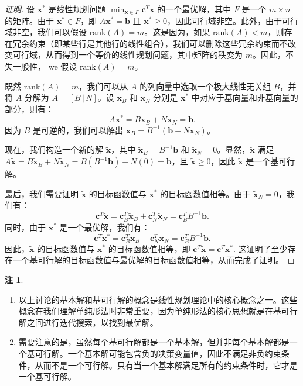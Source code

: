 \documentclass[12pt]{article}
\theoremstyle{plain}
\theoremstyle{definition}
\newtheorem{rmk}{注}[subsection]
\newenvironment{prf}[1][证明]{\begin{proof}[#1]}{\end{proof}}
\newcommand{\rank}{\mathrm{rank}}
\begin{document}
\begin{prf}
    设 $\bm{x}^*$ 是线性规划问题 $\displaystyle \min_{\bm{x} \in F} \bm{c}^T \bm{x}$ 的一个最优解，其中 $F$ 是一个 $m \times n$ 的矩阵。由于 $\bm{x}^* \in F$，即 $A\bm{x}^* = \bm{b}$ 且 $\bm{x}^* \geq 0$，因此可行域非空。此外，由于可行域非空，我们可以假设 $\rank(A) = m$。这是因为，如果 $\rank(A) < m$，则存在冗余约束（即某些行是其他行的线性组合），我们可以删除这些冗余约束而不改变可行域，从而得到一个等价的线性规划问题，其中矩阵的秩变为 $m$。因此，不失一般性， we 假设 $\rank(A) = m$。

    既然 $\rank(A) = m$，我们可以从 $A$ 的列向量中选取一个极大线性无关组 $B$，并将 $A$ 分解为 $A = [B \,|\, N]$。设 $\bm{x}_B$ 和 $\bm{x}_N$ 分别是 $\bm{x}^*$ 中对应于基向量和非基向量的部分，则有：
    \[
    A\bm{x}^* = B\bm{x}_B + N\bm{x}_N = \bm{b}.
    \]
    因为 $B$ 是可逆的，我们可以解出 $\bm{x}_B = B^{-1}(\bm{b} - N\bm{x}_N)$。

    现在，我们构造一个新的解 $\tilde{\bm{x}}$，其中 $\tilde{\bm{x}}_B = B^{-1}\bm{b}$ 和 $\tilde{\bm{x}}_N = 0$。显然，$\tilde{\bm{x}}$ 满足 $A\tilde{\bm{x}} = B\tilde{\bm{x}}_B + N\tilde{\bm{x}}_N = B(B^{-1}\bm{b}) + N(0) = \bm{b}$，且 $\tilde{\bm{x}} \geq 0$，因此 $\tilde{\bm{x}}$ 是一个基可行解。

    最后，我们需要证明 $\tilde{\bm{x}}$ 的目标函数值与 $\bm{x}^*$ 的目标函数值相等。由于 $\tilde{\bm{x}}_N = 0$，我们有：
    \[
    \bm{c}^T \tilde{\bm{x}} = \bm{c}_B^T \tilde{\bm{x}}_B + \bm{c}_N^T \tilde{\bm{x}}_N = \bm{c}_B^T B^{-1}\bm{b}.
    \]
    同时，由于 $\bm{x}^*$ 是一个最优解，我们有：
    \[
    \bm{c}^T \bm{x}^* = \bm{c}_B^T \bm{x}_B + \bm{c}_N^T \bm{x}_N = \bm{c}_B^T B^{-1}\bm{b}.
    \]
    因此，$\tilde{\bm{x}}$ 的目标函数值与 $\bm{x}^*$ 的目标函数值相等，即 $\bm{c}^T \tilde{\bm{x}} = \bm{c}^T \bm{x}^*$. 这证明了至少存在一个基可行解的目标函数值与最优解的目标函数值相等，从而完成了证明。
\end{prf}
\begin{rmk}
    \begin{enumerate}
        \item 以上讨论的基本解和基可行解的概念是线性规划理论中的核心概念之一。这些概念在我们理解单纯形法时非常重要，因为单纯形法的核心思想就是在基可行解之间进行迭代搜索，以找到最优解。
        \item 需要注意的是，虽然每个基可行解都是一个基本解，但并非每个基本解都是一个基可行解。一个基本解可能包含负的决策变量值，因此不满足非负约束条件，从而不是一个可行解。只有当一个基本解满足所有的约束条件时，它才是一个基可行解。
    \end{enumerate}
\end{rmk}
\end{document}
